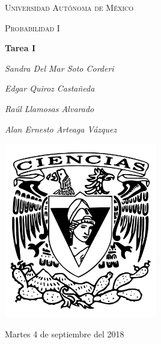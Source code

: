 \documentclass[12pt,a4paper]{report}
\begin{document}
\begin{titlepage}
	\centering
	{\scshape\LARGE Universidad Autónoma de México \par}
	\vspace{1cm}
	{\scshape\Large Probabilidad I\par}
	\vspace{1.5cm}
	{\huge\bfseries Tarea I\par}
	\vspace{.5cm}
	{\Large\itshape Sandra Del Mar Soto Corderi \par}
	\vspace{.5cm}
	{\Large\itshape Edgar Quiroz Castañeda \par}
    \vspace{.5cm}
	{\Large\itshape Raúl Llamosas Alvarado \par}
	 \vspace{.5cm}
	{\Large\itshape Alan Ernesto Arteaga Vázquez \par}
	\vfill
	 \includegraphics[width=0.5\textwidth]{escudo.png}
	\vfill

	{\large Martes 4 de septiembre del 2018 \par}
\end{titlepage}

\pagebreak
\setlength{\voffset}{-0.75in}
\setlength{\headsep}{5pt}
\end{document}
